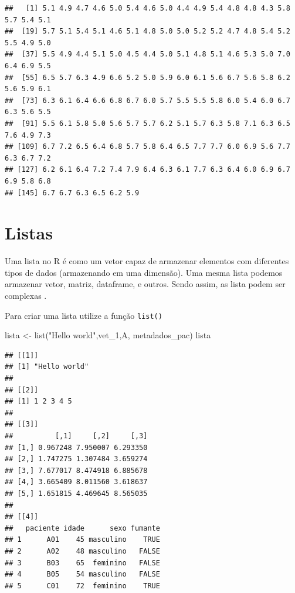 \documentclass[
]{book}
\newenvironment{Shaded}{\begin{snugshade}}{\end{snugshade}}
\newcommand{\CommentTok}[1]{\textcolor[rgb]{0.56,0.35,0.01}{\textit{#1}}}
\newcommand{\FunctionTok}[1]{\textcolor[rgb]{0.00,0.00,0.00}{#1}}
\newcommand{\NormalTok}[1]{#1}
\newcommand{\OtherTok}[1]{\textcolor[rgb]{0.56,0.35,0.01}{#1}}
\newcommand{\SpecialCharTok}[1]{\textcolor[rgb]{0.00,0.00,0.00}{#1}}
\newcommand{\StringTok}[1]{\textcolor[rgb]{0.31,0.60,0.02}{#1}}
\begin{document}
\begin{Shaded}
\end{Shaded}

\begin{verbatim}
##   [1] 5.1 4.9 4.7 4.6 5.0 5.4 4.6 5.0 4.4 4.9 5.4 4.8 4.8 4.3 5.8 5.7 5.4 5.1
##  [19] 5.7 5.1 5.4 5.1 4.6 5.1 4.8 5.0 5.0 5.2 5.2 4.7 4.8 5.4 5.2 5.5 4.9 5.0
##  [37] 5.5 4.9 4.4 5.1 5.0 4.5 4.4 5.0 5.1 4.8 5.1 4.6 5.3 5.0 7.0 6.4 6.9 5.5
##  [55] 6.5 5.7 6.3 4.9 6.6 5.2 5.0 5.9 6.0 6.1 5.6 6.7 5.6 5.8 6.2 5.6 5.9 6.1
##  [73] 6.3 6.1 6.4 6.6 6.8 6.7 6.0 5.7 5.5 5.5 5.8 6.0 5.4 6.0 6.7 6.3 5.6 5.5
##  [91] 5.5 6.1 5.8 5.0 5.6 5.7 5.7 6.2 5.1 5.7 6.3 5.8 7.1 6.3 6.5 7.6 4.9 7.3
## [109] 6.7 7.2 6.5 6.4 6.8 5.7 5.8 6.4 6.5 7.7 7.7 6.0 6.9 5.6 7.7 6.3 6.7 7.2
## [127] 6.2 6.1 6.4 7.2 7.4 7.9 6.4 6.3 6.1 7.7 6.3 6.4 6.0 6.9 6.7 6.9 5.8 6.8
## [145] 6.7 6.7 6.3 6.5 6.2 5.9
\end{verbatim}

\hypertarget{listas}{%
\section{Listas}\label{listas}}

Uma lista no R é como um vetor capaz de armazenar elementos com diferentes tipos de dados (armazenando em uma dimensão). Uma mesma lista podemos armazenar vetor, matriz, dataframe, e outros. Sendo assim, as lista podem ser complexas .

Para criar uma lista utilize a função \texttt{list()}

\begin{Shaded}
\begin{Highlighting}[]
\NormalTok{lista }\OtherTok{\textless{}{-}} \FunctionTok{list}\NormalTok{(}\StringTok{"Hello world"}\NormalTok{,vet\_1,A, metadados\_pac) }
\NormalTok{lista}
\end{Highlighting}
\end{Shaded}

\begin{verbatim}
## [[1]]
## [1] "Hello world"
## 
## [[2]]
## [1] 1 2 3 4 5
## 
## [[3]]
##          [,1]     [,2]     [,3]
## [1,] 0.967248 7.950007 6.293350
## [2,] 1.747275 1.307484 3.659274
## [3,] 7.677017 8.474918 6.885678
## [4,] 3.665409 8.011560 3.618637
## [5,] 1.651815 4.469645 8.565035
## 
## [[4]]
##   paciente idade      sexo fumante
## 1      A01    45 masculino    TRUE
## 2      A02    48 masculino   FALSE
## 3      B03    65  feminino   FALSE
## 4      B05    54 masculino   FALSE
## 5      C01    72  feminino    TRUE
\end{verbatim}
\end{document}
